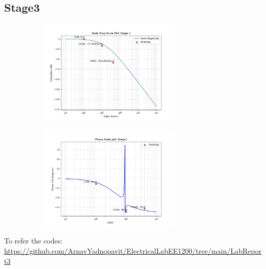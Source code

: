 \documentclass[a4paper,12pt]{article}
\begin{document}
\subsection*{Stage3}
\begin{figure}[H]
    \centering
    \begin{subfigure}{0.5\textwidth}
        \centering
        \includegraphics[height=5cm]{figs/Stage3/Magn.png}
    \end{subfigure}%
    \begin{subfigure}{0.5\textwidth}
        \centering
        \includegraphics[height=5cm]{figs/Stage3/Phase.png}
    \end{subfigure}
\end{figure}
To refer the codes:\\
\url{https://github.com/ArnavYadnopavit/ElectricalLabEE1200/tree/main/LabReport3}\\

\end{document}
